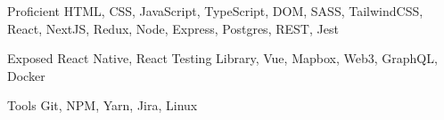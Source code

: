 
\begin{cvskills}
  \cvskill
    {Proficient} %
    {HTML, CSS, JavaScript, TypeScript, DOM, SASS, TailwindCSS, React, NextJS, Redux, Node, Express, Postgres, REST, Jest} %

  \cvskill
    {Exposed} %
    {React Native, React Testing Library, Vue, Mapbox, Web3, GraphQL, Docker} %

  \cvskill
    {Tools} %
    {Git, NPM, Yarn, Jira, Linux} %
\end{cvskills}
